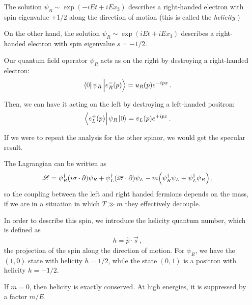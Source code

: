 \documentclass[main.tex]{subfiles}
\begin{document}
The solution \(\psi_{R} \sim \exp(-iEt + i E x_3)\) describes a right-handed electron with spin eigenvalue \(+1/2\) along the direction of motion (this is called the \emph{helicity} \cite[sec.\ 1.4.9]{tissinoTheoreticalPhysicsNotes2020})

On the other hand, the solution \(\psi_{R} \sim \exp(iEt + iE x_3)\) describes a right-handed electron with spin eigenvalue \(s = - 1/2\). 

Our quantum field operator \(\psi_{R}\) acts as on the right by destroying a right-handed electron:
%
\begin{align}
\bra{0}\psi_{R} \ket{e^{-}_{R} (p)} = u_R(p) e^{-ipx}
\,.
\end{align}

Then, we can have it acting on the left by destroying a left-handed positron:
%
\begin{align}
\bra{e^{+}_{L}(p)} \psi_{R} \ket{0} = v_L (p) e^{+ipx}
\,.
\end{align}

If we were to repeat the analysis for the other spinor, we would get the specular result. 

The Lagrangian can be written as 
%
\begin{align}
\mathscr{L} = 
\psi_R ^\dag \qty(i \sigma \cdot \partial) \psi_{R}+
\psi_L ^\dag \qty(i \overline{\sigma} \cdot \partial) \psi_{L}
- m \qty( \psi ^\dag _R \psi_{L}
+ \psi ^\dag_L \psi_{R})
\,,
\end{align}
%
so the coupling between the left and right handed fermions depends on the mass, if we are in a situation in which \(T \gg m\) they effectively decouple.


In order to describe this spin, we introduce the helicity quantum number, which is defined as 
%
\begin{align}
h = \hat{p} \cdot \vec{s}
\,,
\end{align}
%
the projection of the spin along the direction of motion. 
For \(\psi_{R}\), we have the \((1,0)\) state with helicity \(h = 1/2\), while the state \((0,1)\) is a positron with helicity \(h = - 1/2\). 

If \(m=0\), then helicity is exactly conserved. At high energies, it is suppressed by a factor \(m / E\). 
\end{document}
